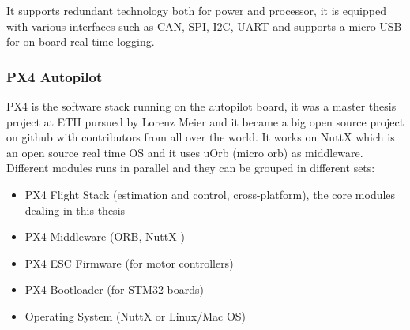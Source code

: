 It supports redundant technology both for power and processor, it is equipped with various interfaces such as CAN, SPI, I2C, UART and supports a micro USB for on board real time logging.

\subsubsection{PX4 Autopilot}
\label{sec:px4autop}
PX4 \cite{PX4} is the software stack running on the autopilot board, it was a master thesis project at ETH pursued by Lorenz Meier and it became a big open source project on github \cite{PX4Git} with contributors from all over the world. It works on NuttX \cite{Nutty} which is an open source real time OS and it uses uOrb (micro orb) as middleware. Different modules runs in parallel and they can be grouped in different sets:

\begin{itemize}

\item PX4 Flight Stack (estimation and control, cross-platform), the core modules dealing in this thesis
\item PX4 Middleware (ORB, NuttX )
\item PX4 ESC Firmware (for motor controllers)
\item PX4 Bootloader (for STM32 boards)
\item Operating System (NuttX or Linux/Mac OS)

\end{itemize}

